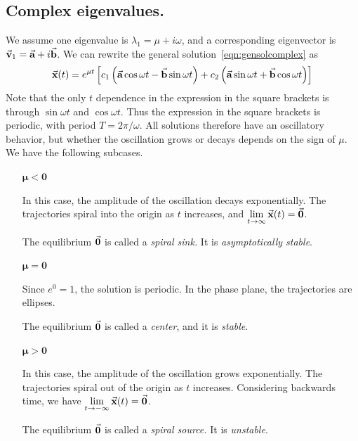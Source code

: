 \subsection*{Complex eigenvalues.}
We assume one eigenvalue is $\lambda_1 = \mu + i\omega$,
and a corresponding eigenvector is
$\vec{\textbf{v}}_1 = \vec{\textbf{a}}+i\vec{\textbf{b}}$.
We can rewrite the general solution~\eqref{eqn:gensolcomplex}
as
\begin{equation}
\vec{\textbf{x}}(t) = 
     e^{\mu t} \left[ c_1 \left(\vec{\textbf{a}}\cos\omega t - \vec{\textbf{b}}\sin\omega t \right)
         + c_2 \left(\vec{\textbf{a}}\sin\omega t + \vec{\textbf{b}}\cos\omega t\right)\right]
\end{equation}
Note that the only $t$ dependence in the expression in the square
brackets is through $\sin\omega t$ and $\cos\omega t$.
Thus the expression in the square brackets is periodic, with
period $T = 2\pi/\omega$.
All solutions therefore have an oscillatory behavior, 
but whether the oscillation grows or decays depends on the
sign of $\mu$.
We have the following subcases.
\begin{enumerate}

\item[$\pmb{\mu < 0}$]

In this case, the amplitude of the oscillation decays
exponentially.
The trajectories spiral into the origin as $t$ increases,
and $\displaystyle\lim_{t\rightarrow\infty} \vec{\textbf{x}}(t) = \vec{\textbf{0}}$.

\noindent
The equilibrium $\vec{\textbf{0}}$ is called a \emph{spiral sink.}
It is \emph{asymptotically stable}.

\smallskip

\item[$\pmb{\mu = 0}$]

Since $e^{0}=1$, the solution is periodic.
In the phase plane, the trajectories are ellipses.

\noindent
The equilibrium $\vec{\textbf{0}}$ is called a \emph{center}, and it is
\emph{stable}.

\smallskip

\item[$\pmb{\mu > 0}$]

In this case, the amplitude of the oscillation grows
exponentially.
The trajectories spiral out of the origin as $t$ increases.
Considering backwards time, we have
$\displaystyle \lim_{t\rightarrow-\infty} \vec{\textbf{x}}(t) = \vec{\textbf{0}}$.

\noindent
The equilibrium $\vec{\textbf{0}}$ is called a \emph{spiral source.}
It is \emph{unstable}.
\end{enumerate}

